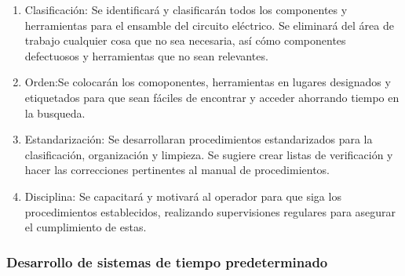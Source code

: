 \begin{itemize}
    \begin{enumerate}
     \item Clasificación: 
        Se identificará y clasificarán todos los componentes y herramientas para el ensamble del circuito eléctrico. Se eliminará del área de trabajo cualquier cosa que no sea necesaria, así cómo componentes defectuosos y herramientas que no sean relevantes.
        \item Orden:Se colocarán los comoponentes, herramientas en lugares designados y etiquetados para que sean fáciles de encontrar y acceder ahorrando tiempo en la busqueda.
        \item Estandarización: Se desarrollaran procedimientos estandarizados para la clasificación, organización y limpieza. Se sugiere crear listas de verificación y hacer las correcciones pertinentes al manual de procedimientos.
        \item Disciplina: Se capacitará y motivará al operador para que siga los procedimientos establecidos, realizando supervisiones regulares para asegurar el cumplimiento de estas.
        
    \end{enumerate}
    
    \end{itemize}
    \subsubsection{Desarrollo de sistemas de tiempo predeterminado}
    

